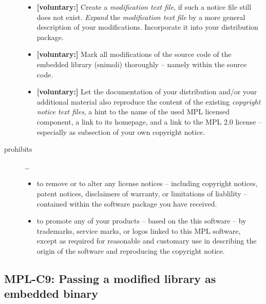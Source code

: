 \begin{description}
\begin{itemize}
  \item \textbf{[voluntary:]} Create a \emph{modification text file}, if such a
  notice file still does not exist. \emph{Expand} the \emph{modification text
  file} by a more general description of your modifications. Incorporate it into
  your distribution package.
  
  \item \textbf{[voluntary:]} Mark all modifications of the source code of the
  embedded library (snimoli) thoroughly -- namely within the source code.
      
  \item \textbf{[voluntary:]} Let the documentation of your distribution and/or
  your additional material also reproduce the content of the existing
  \emph{copyright notice text files}, a hint to the name of the used MPL
  licensed component, a link to its homepage, and a link to the MPL 2.0 license
  -- especially as subsection of your own copyright notice.
 
\end{itemize}

\item[prohibits] \ldots
\begin{itemize}
  \item to remove or to alter any license notices -- including copyright
  notices, patent notices, disclaimers of warranty, or limitations of liablility
  -- contained within the software package you have received.
  \item to promote any of your products -- based on the this software -- by
  trademarks, service marks, or logos linked to this MPL software, except as 
  required for reasonable and customary use in describing the origin
  of the software and reproducing the  copyright notice.
\end{itemize}

\end{description}


\subsection{MPL-C9: Passing a modified library as embedded binary}
\label{OSUC-10B-MPL}

